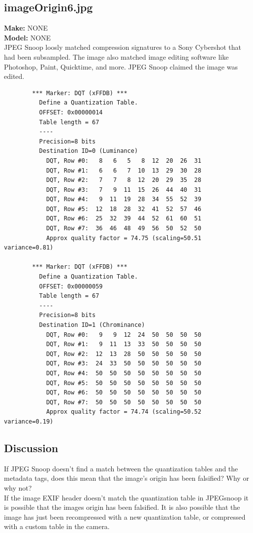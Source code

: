 \documentclass{article}
\begin{document}
\subsection{imageOrigin6.jpg}
	\textbf{Make:} NONE\\
	\textbf{Model:} NONE\\
JPEG Snoop loosly matched compression signatures to a Sony Cybershot
that had been subsampled. The image also matched image editing software
like Photoshop, Paint, Quicktime, and more. JPEG Snoop claimed the
image was edited.
\begin{lstlisting}
		*** Marker: DQT (xFFDB) ***
		  Define a Quantization Table.
		  OFFSET: 0x00000014
		  Table length = 67
		  ----
		  Precision=8 bits
		  Destination ID=0 (Luminance)
			DQT, Row #0:   8   6   5   8  12  20  26  31 
			DQT, Row #1:   6   6   7  10  13  29  30  28 
			DQT, Row #2:   7   7   8  12  20  29  35  28 
			DQT, Row #3:   7   9  11  15  26  44  40  31 
			DQT, Row #4:   9  11  19  28  34  55  52  39 
			DQT, Row #5:  12  18  28  32  41  52  57  46 
			DQT, Row #6:  25  32  39  44  52  61  60  51 
			DQT, Row #7:  36  46  48  49  56  50  52  50 
			Approx quality factor = 74.75 (scaling=50.51 variance=0.81)
		 
		*** Marker: DQT (xFFDB) ***
		  Define a Quantization Table.
		  OFFSET: 0x00000059
		  Table length = 67
		  ----
		  Precision=8 bits
		  Destination ID=1 (Chrominance)
			DQT, Row #0:   9   9  12  24  50  50  50  50 
			DQT, Row #1:   9  11  13  33  50  50  50  50 
			DQT, Row #2:  12  13  28  50  50  50  50  50 
			DQT, Row #3:  24  33  50  50  50  50  50  50 
			DQT, Row #4:  50  50  50  50  50  50  50  50 
			DQT, Row #5:  50  50  50  50  50  50  50  50 
			DQT, Row #6:  50  50  50  50  50  50  50  50 
			DQT, Row #7:  50  50  50  50  50  50  50  50 
			Approx quality factor = 74.74 (scaling=50.52 variance=0.19)
\end{lstlisting}

\subsection{Discussion}
If JPEG Snoop doesn’t find a match between the quantization tables and the metadata tags, does this mean that the image’s origin has been falsified? Why or why not?\\
If the image EXIF header doesn't match the quantization table in JPEGsnoop
it is possible that the images origin has been falsified. It is also
possible that the image has just been recompressed with a new quantization
table, or compressed with a custom table in the camera.
\end{document}

